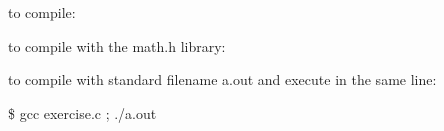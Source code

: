 to compile\+:


\begin{DoxyCode}{0}
\DoxyCodeLine{ \{\$\}}
\DoxyCodeLine{}
\DoxyCodeLine{}

\end{DoxyCode}


to compile with the math.\+h library\+:


\begin{DoxyCode}{0}
\DoxyCodeLine{ \{\$\}}
\DoxyCodeLine{}
\DoxyCodeLine{}

\end{DoxyCode}


to compile with standard filename a.\+out and execute in the same line\+:

{\ttfamily \$ gcc exercise.\+c ; ./a.out} 
